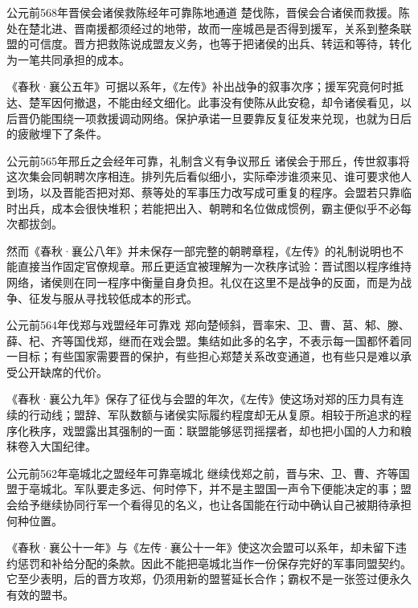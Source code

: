 \begin{event}{公元前568年}{晋侯会诸侯救陈}{经年可靠}{陈地通道}
楚伐陈，晋侯会合诸侯而救援。陈处在楚北进、晋南援都须经过的地带，故而一座城邑是否得到援军，关系到整条联盟的可信度。晋方把救陈说成盟友义务，也等于把诸侯的出兵、转运和等待，转化为一笔共同承担的成本。

《春秋·襄公五年》可据以系年，《左传》补出战争的叙事次序；援军究竟何时抵达、楚军因何撤退，不能由经文细化。此事没有使陈从此安稳，却令诸侯看见，以后晋仍能围绕一项救援调动网络。保护承诺一旦要靠反复征发来兑现，也就为日后的疲敝埋下了条件。
\end{event}

\begin{event}{公元前565年}{邢丘之会}{经年可靠，礼制含义有争议}{邢丘}
诸侯会于邢丘，传世叙事将这次集会同朝聘次序相连。排列先后看似细小，实际牵涉谁须来见、谁可要求他人到场，以及晋能否把对郑、蔡等处的军事压力改写成可重复的程序。会盟若只靠临时出兵，成本会很快堆积；若能把出入、朝聘和名位做成惯例，霸主便似乎不必每次都拔剑。

然而《春秋·襄公八年》并未保存一部完整的朝聘章程，《左传》的礼制说明也不能直接当作固定官僚规章。邢丘更适宜被理解为一次秩序试验：晋试图以程序维持网络，诸侯则在同一程序中衡量自身负担。礼仪在这里不是战争的反面，而是为战争、征发与服从寻找较低成本的形式。
\end{event}

\begin{event}{公元前564年}{伐郑与戏盟}{经年可靠}{戏}
郑向楚倾斜，晋率宋、卫、曹、莒、邾、滕、薛、杞、齐等国伐郑，继而在戏会盟。集结如此多的名字，不表示每一国都怀着同一目标；有些国家需要晋的保护，有些担心郑楚关系改变通道，也有些只是难以承受公开缺席的代价。

《春秋·襄公九年》保存了征伐与会盟的年次，《左传》使这场对郑的压力具有连续的行动线；盟辞、军队数额与诸侯实际履约程度却无从复原。相较于所追求的程序化秩序，戏盟露出其强制的一面：联盟能够惩罚摇摆者，却也把小国的人力和粮秣卷入大国纪律。
\end{event}

\begin{event}{公元前562年}{亳城北之盟}{经年可靠}{亳城北}
继续伐郑之前，晋与宋、卫、曹、齐等国盟于亳城北。军队要走多远、何时停下，并不是主盟国一声令下便能决定的事；盟会给予继续协同行军一个看得见的名义，也让各国能在行动中确认自己被期待承担何种位置。

《春秋·襄公十一年》与《左传·襄公十一年》使这次会盟可以系年，却未留下违约惩罚和补给分配的条款。因此不能把亳城北当作一份保存完好的军事同盟契约。它至少表明，后的晋方攻郑，仍须用新的盟誓延长合作；霸权不是一张签过便永久有效的盟书。
\end{event}

